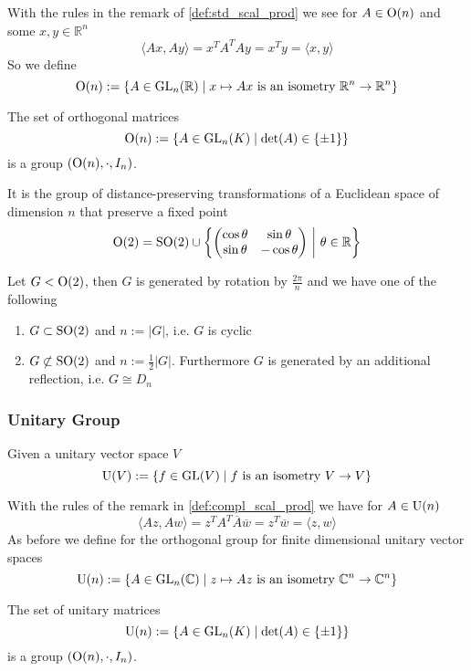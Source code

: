 With the rules in the remark of \cref{def:std_scal_prod} we see for \(A \in \operatorname{O}(n)\) and some \(x, y \in \mathbb{R}^n\)
\[\langle Ax, Ay\rangle = x^TA^TAy = x^Ty = \langle x, y\rangle\]
So we define
\[\operatorname{O}(n) := \{A \in \operatorname{GL}_n(\mathbb{R}) \mid x \mapsto Ax~\text{is an isometry}~\mathbb{R}^n \to \mathbb{R}^n\}\]

\begin{proposition}
   The set of orthogonal matrices
   \[\operatorname{O}(n) := \{A \in \operatorname{GL}_n(K) \mid \det(A) \in \{\pm 1\}\}\]
   is a group \((\operatorname{O}(n), \cdot, I_n)\).
\end{proposition}
\begin{remark}
   It is the group of distance-preserving transformations of a Euclidean space of dimension \(n\) that preserve a fixed point
   \[\operatorname{O}(2) = \operatorname{SO}(2) \cup \left\{\begin{pmatrix}\cos\theta & \sin\theta\\ \sin\theta & -\cos\theta\end{pmatrix} ~\middle|~ \theta \in \mathbb{R}\right\}\]
\end{remark}

\begin{proposition}
   Let \(G < \operatorname{O}(2)\), then \(G\) is generated by rotation by \(\frac{2\pi}{n}\) and we have one of the following
   \begin{enumerate}[label=\roman*, align=Center]
      \item \(G \subset \operatorname{SO}(2)\) and \(n := |G|\), i.e. \(G\) is cyclic
      \item \(G \not\subset \operatorname{SO}(2)\) and \(n := \frac{1}{2} \lvert G \rvert\).
         Furthermore \(G\) is generated by an additional reflection, i.e. \(G \cong D_n\)
   \end{enumerate}
\end{proposition}

\subsubsection{Unitary Group}
\begin{proposition}
   Given a unitary vector space \(V\)
   \[\operatorname{U}(V) := \{f \in \operatorname{GL}(V) \mid f~\text{is an isometry}~V \to V\}\]
\end{proposition}

With the rules of the remark in \cref{def:compl_scal_prod} we have for \(A \in \operatorname{U}(n)\)
\[\langle Az, Aw\rangle = z^TA^T\overline{A}\overline{w} = z^T \overline{w} = \langle z, w\rangle\]
As before we define for the orthogonal group for finite dimensional unitary vector spaces
\[\operatorname{U}(n) := \{A \in \operatorname{GL}_n(\mathbb{C}) \mid z \mapsto Az~\text{is an isometry}~\mathbb{C}^n \to \mathbb{C}^n\}\]
\begin{proposition}
   The set of unitary matrices
   \[\operatorname{U}(n) := \{A \in \operatorname{GL}_n(K) \mid \det(A) \in \{\pm 1\}\}\]
   is a group \((\operatorname{O}(n), \cdot, I_n)\).
\end{proposition}

